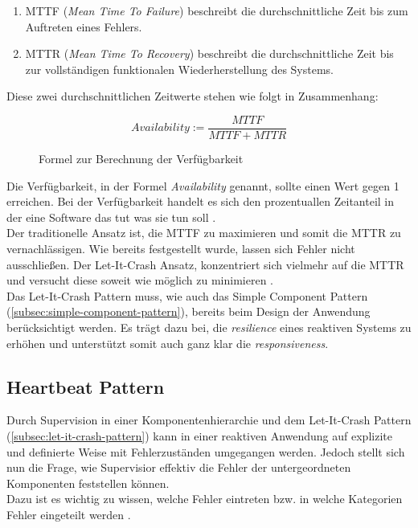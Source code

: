 \begin{enumerate}
\item MTTF (\textit{Mean Time To Failure}) beschreibt die durchschnittliche Zeit bis zum Auftreten eines Fehlers.
\item MTTR (\textit{Mean Time To Recovery}) beschreibt die durchschnittliche Zeit bis zur vollständigen funktionalen Wiederherstellung des Systems.
\end{enumerate}

Diese zwei durchschnittlichen Zeitwerte stehen wie folgt in Zusammenhang:

\begin{figure}[H]
\[Availability := \frac{MTTF}{MTTF + MTTR}\]
\caption{Formel zur Berechnung der Verfügbarkeit}
\end{figure}

Die Verfügbarkeit, in der Formel \textit{Availability} genannt, sollte einen Wert gegen 1 erreichen. Bei der Verfügbarkeit handelt es sich den prozentuallen Zeitanteil in der eine Software das tut was sie tun soll \cite[S.~11]{hanmer_patterns_2007}.\\
Der traditionelle Ansatz ist, die MTTF zu maximieren und somit die MTTR zu vernachlässigen. Wie bereits festgestellt wurde, lassen sich Fehler nicht ausschließen. Der Let-It-Crash Ansatz, konzentriert sich vielmehr auf die MTTR und versucht diese soweit wie möglich zu minimieren \cite[S.~198]{kuhn_reactive_2015} \cite{friedrichsen_unkaputtbar_2014}.\\

Das Let-It-Crash Pattern muss, wie auch das Simple Component Pattern (\ref{subsec:simple-component-pattern}), bereits beim Design der Anwendung berücksichtigt werden. Es trägt dazu bei, die \textit{resilience} eines reaktiven Systems zu erhöhen und unterstützt somit auch ganz klar die \textit{responsiveness}.

\pagebreak

\subsection{Heartbeat Pattern}\label{subsec:heartbeat-pattern}
Durch Supervision in einer Komponentenhierarchie und dem Let-It-Crash Pattern (\ref{subsec:let-it-crash-pattern}) kann in einer reaktiven Anwendung auf explizite und definierte Weise mit Fehlerzuständen umgegangen werden. Jedoch stellt sich nun die Frage, wie Supervisior effektiv die Fehler der untergeordneten Komponenten feststellen können.\\
Dazu ist es wichtig zu wissen, welche Fehler eintreten bzw. in welche Kategorien Fehler eingeteilt werden \cite{friedrichsen_unkaputtbar_2014}.

